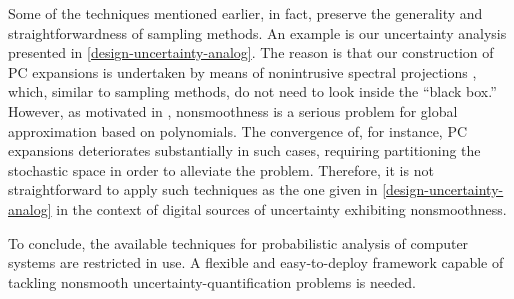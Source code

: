 Some of the techniques mentioned earlier, in fact, preserve the generality and
straightforwardness of sampling methods. An example is our uncertainty analysis
presented in \cref{design-uncertainty-analog}. The reason is that our
construction of \ac{PC} expansions is undertaken by means of nonintrusive
spectral projections \cite{xiu2010}, which, similar to sampling methods, do not
need to look inside the ``black box.'' However, as motivated in
, nonsmoothness is a serious problem for global
approximation based on polynomials. The convergence of, for instance, \ac{PC}
expansions deteriorates substantially in such cases, requiring partitioning the
stochastic space in order to alleviate the problem. Therefore, it is not
straightforward to apply such techniques as the one given in
\cref{design-uncertainty-analog} in the context of digital sources of
uncertainty exhibiting nonsmoothness.

To conclude, the available techniques for probabilistic analysis of computer
systems are restricted in use. A flexible and easy-to-deploy framework capable
of tackling nonsmooth uncertainty-quantification problems is needed.
